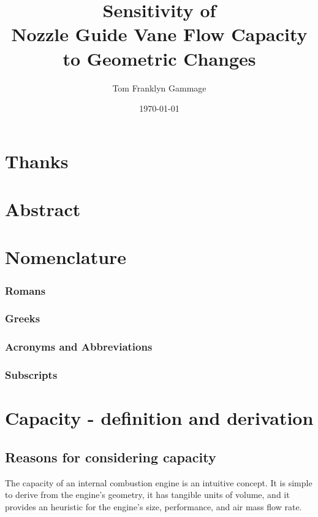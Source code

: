 \documentclass[11pt, twoside]{report}
\title{Sensitivity of \\Nozzle Guide Vane Flow Capacity \\to Geometric Changes}
\author{Tom Franklyn Gammage}
\date{\mydate\today}
\begin{document}
\maketitle




\chapter*{Thanks}

\chapter*{Abstract}

\tableofcontents
\listoffigures
\listoftables

\chapter*{Nomenclature}
\subsection*{Romans}
\subsection*{Greeks}
\subsection*{Acronyms and Abbreviations}
\subsection*{Subscripts}




\chapter{Capacity - definition and derivation}


\section{Reasons for considering capacity}

The capacity of an internal combustion engine is an intuitive concept. It is simple to derive from the engine's geometry, it has tangible units of volume, and it provides an heuristic for the engine's size, performance, and air mass flow rate.
\end{document}
